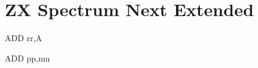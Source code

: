 \section{ZX Spectrum Next Extended}
\label{zx_next_instructions_table}

\begin{minipage}{\textwidth}

\begin{instrtable}

    \begin{instruction}{ADD rr,A} 
            \FlagsADDrra
        \SkipToOpCode 
    \end{instruction}

    \begin{instruction}{ADD pp,nm} 
            \FlagsADDrrnn
        \SkipToOpCode 
        \SkipToOpCode 
        \SkipToOpCode 
    \end{instruction}


\end{instrtable}
\end{minipage}

